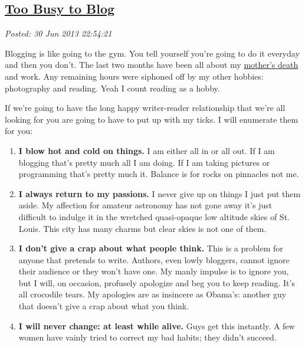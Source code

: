 %

\subsection*{\href{http://bakerjd99.wordpress.com/2013/06/30/too-busy-to-blog/}{Too Busy to Blog}}


\noindent\emph{Posted: 30 Jun 2013 22:54:21}
\vspace{6pt}

Blogging is like going to the gym. You tell yourself you're going to do
it everyday and then you don't. The last two months have been all about
my \href{http://bakerjd99.wordpress.com/2013/05/15/evelyns-eulogy/}{mother's
death} and work. Any remaining hours were siphoned off by my other
hobbies: photography and reading. Yeah I count reading as a hobby.

If we're going to have the long happy writer-reader relationship that
we're all looking for you are going to have to put up with my ticks. I
will enumerate them for you:

\begin{enumerate}
\item
  \textbf{I blow hot and cold on things.} I am either all in or all out.
  If I am blogging that's pretty much all I am doing. If I am taking
  pictures or programming that's pretty much it. Balance is for rocks on
  pinnacles not me.
\item
  \textbf{I always return to my passions.} I never give up on things I
  just put them aside. My affection for amateur astronomy has not gone
  away it's just difficult to indulge it in the wretched quasi-opaque
  low altitude skies of St. Louis. This city has many charms but clear
  skies is not one of them.
\item
  \textbf{I don't give a crap about what people think.} This is a
  problem for anyone that pretends to write. Authors, even lowly
  bloggers, cannot ignore their audience or they won't have one. My
  manly impulse is to ignore you, but I will, on occasion, profusely
  apologize and beg you to keep reading. It's all crocodile tears. My
  apologies are as insincere as Obama's: another guy that doesn't give a
  crap about what you think.
\item
  \textbf{I will never change: at least while alive.} Guys get this
  instantly. A few women have vainly tried to correct my bad habits;
  they didn't succeed.
\end{enumerate}

